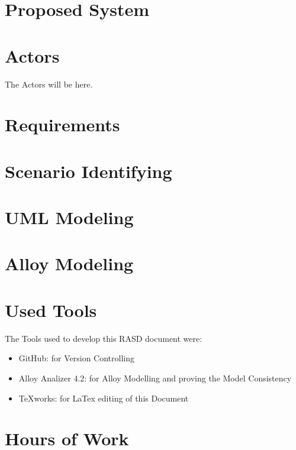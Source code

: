 \documentclass[a4paper]{article}
\begin{document}
\section{Proposed System}

\section{Actors}

The Actors will be here.

\section{Requirements}

\section{Scenario Identifying}

\section{UML Modeling}

\section{Alloy Modeling}
\newpage

\section{Used Tools}
The Tools used to develop this RASD document were:
\begin{itemize}
	\item GitHub: for Version Controlling
	\item Alloy Analizer 4.2: for Alloy Modelling and proving the Model Consistency 
	\item TeXworks: for LaTex editing of this Document
\end{itemize}
\newpage

\section{Hours of Work}
\end{document}

